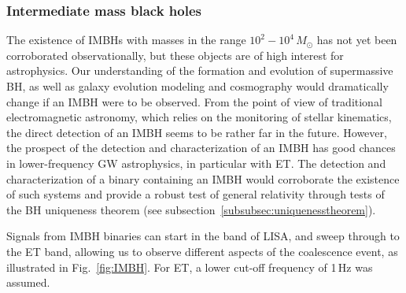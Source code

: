\subsubsection{Intermediate mass black holes}

The existence of IMBHs with masses in the range
$10^2 - 10^4\,M_\odot$ has not yet been corroborated observationally, but these
objects are of high interest for astrophysics. Our understanding of the formation and
evolution of supermassive BH, as well as galaxy evolution modeling and
cosmography would dramatically change if an IMBH were to be observed. From the
point of view of traditional electromagnetic astronomy, which relies on the monitoring of
stellar kinematics, the direct detection of an IMBH seems to be rather far in the future.
However, the prospect of the detection and characterization of an IMBH has good chances in
lower-frequency GW astrophysics, in particular with ET. The detection and characterization of
a binary containing an IMBH would corroborate the existence of such systems and
provide a robust test of general relativity through tests of the BH
uniqueness theorem (see subsection~\ref{subsubsec:uniquenesstheorem}).

Signals from IMBH binaries can start in the band of LISA, and sweep through to the
ET band, allowing us to observe different aspects of the coalescence event, as illustrated
in Fig.~\ref{fig:IMBH}. For ET, a lower cut-off frequency of 1\,Hz was assumed.

